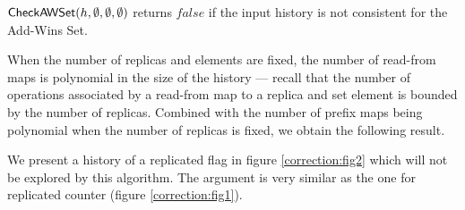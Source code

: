 \begin{theorem}

  $\mathsf{CheckAWSet}({h},\emptyset,\emptyset,\emptyset)$ returns $\mathit{false}$ if the input history is not consistent for the Add-Wins Set.

\end{theorem}

When the number of replicas and elements are fixed, the number of read-from maps is polynomial in the size of the history — recall that the number of operations associated by a read-from map to a replica and set element is bounded by the number of replicas. Combined with the number of prefix maps being polynomial when the number of replicas is fixed, we obtain the following result.


We present a history of a replicated flag in figure \ref{correction:fig2} which will not be explored by this algorithm. The argument is very similar as the one for replicated counter (figure \ref{correction:fig1}).



